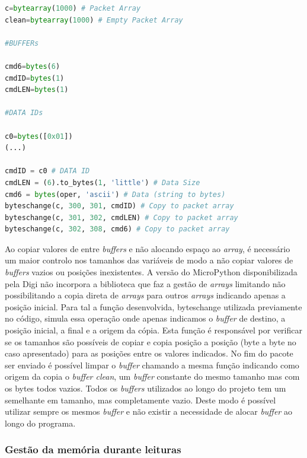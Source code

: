 \begin{lstlisting}[caption=Exemplo com a concatenação da operadora,label={py1},language=Python]
c=bytearray(1000) # Packet Array
clean=bytearray(1000) # Empty Packet Array 
 
#BUFFERs

cmd6=bytes(6)
cmdID=bytes(1)
cmdLEN=bytes(1)
 
#DATA IDs

c0=bytes([0x01])
(...) 

cmdID = c0 # DATA ID
cmdLEN = (6).to_bytes(1, 'little') # Data Size
cmd6 = bytes(oper, 'ascii') # Data (string to bytes)
byteschange(c, 300, 301, cmdID) # Copy to packet array 
byteschange(c, 301, 302, cmdLEN) # Copy to packet array 
byteschange(c, 302, 308, cmd6) # Copy to packet array 
\end{lstlisting}

\par Ao copiar valores de entre \textit{buffers} e não alocando espaço ao \textit{array}, é necessário um maior controlo nos tamanhos das variáveis de modo a não copiar valores de \textit{buffers} vazios ou posições inexistentes. A versão do MicroPython disponibilizada pela Digi não incorpora a biblioteca que faz a gestão de \textit{arrays} limitando não possibilitando a copia direta de \textit{arrays} para outros \textit{arrays} indicando apenas a posição inicial. Para tal a função desenvolvida, byteschange utilizada previamente no código, simula essa operação onde apenas indicamos o \textit{buffer} de destino, a posição inicial, a final e a origem da cópia. Esta função é responsável por verificar se os tamanhos são possíveis de copiar e copia posição a posição (byte a byte no caso apresentado) para as posições entre os valores indicados. No fim do pacote ser enviado é possível limpar o \textit{buffer} chamando a mesma função indicando como origem da copia o \textit{buffer clean}, um \textit{buffer} constante do mesmo tamanho mas com os bytes todos vazios. Todos os \textit{buffers} utilizados ao longo do projeto tem um semelhante em tamanho, mas completamente vazio. Deste modo é possível utilizar sempre os mesmos \textit{buffer} e não existir a necessidade de alocar \textit{buffer} ao longo do programa.

\subsubsection {Gestão da memória durante leituras}

